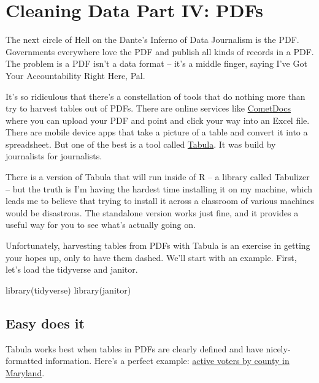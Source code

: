 \documentclass[
  letterpaper,
  DIV=11,
  numbers=noendperiod]{scrreprt}
\newenvironment{Shaded}{\begin{snugshade}}{\end{snugshade}}
\newcommand{\FunctionTok}[1]{\textcolor[rgb]{0.28,0.35,0.67}{#1}}
\newcommand{\NormalTok}[1]{\textcolor[rgb]{0.00,0.23,0.31}{#1}}
\begin{document}
\hypertarget{cleaning-data-part-iv-pdfs}{%
\chapter{Cleaning Data Part IV: PDFs}\label{cleaning-data-part-iv-pdfs}}

The next circle of Hell on the Dante's Inferno of Data Journalism is the
PDF. Governments everywhere love the PDF and publish all kinds of
records in a PDF. The problem is a PDF isn't a data format -- it's a
middle finger, saying I've Got Your Accountability Right Here, Pal.

It's so ridiculous that there's a constellation of tools that do nothing
more than try to harvest tables out of PDFs. There are online services
like \href{https://www.cometdocs.com/}{CometDocs} where you can upload
your PDF and point and click your way into an Excel file. There are
mobile device apps that take a picture of a table and convert it into a
spreadsheet. But one of the best is a tool called
\href{https://tabula.technology/}{Tabula}. It was build by journalists
for journalists.

There is a version of Tabula that will run inside of R -- a library
called Tabulizer -- but the truth is I'm having the hardest time
installing it on my machine, which leads me to believe that trying to
install it across a classroom of various machines would be disastrous.
The standalone version works just fine, and it provides a useful way for
you to see what's actually going on.

Unfortunately, harvesting tables from PDFs with Tabula is an exercise in
getting your hopes up, only to have them dashed. We'll start with an
example. First, let's load the tidyverse and janitor.

\begin{Shaded}
\begin{Highlighting}[]
\FunctionTok{library}\NormalTok{(tidyverse)}
\FunctionTok{library}\NormalTok{(janitor)}
\end{Highlighting}
\end{Shaded}

\hypertarget{easy-does-it}{%
\section{Easy does it}\label{easy-does-it}}

Tabula works best when tables in PDFs are clearly defined and have
nicely-formatted information. Here's a perfect example:
\href{https://elections.maryland.gov/press_room/2020_stats/Eligible\%20Active\%20Voters\%20by\%20County\%20-\%20PG20.pdf}{active
voters by county in Maryland}.
\end{document}
